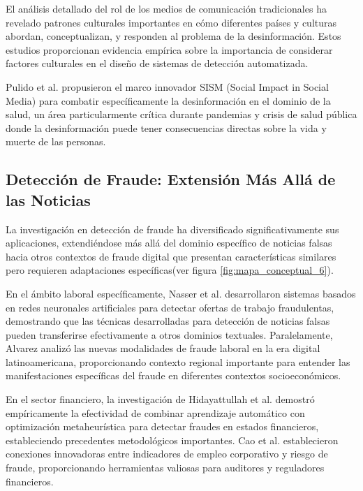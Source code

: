 El análisis detallado del rol de los medios de comunicación tradicionales \cite{carcamo2021fake, perez2020fake} ha revelado patrones culturales importantes en cómo diferentes países y culturas abordan, conceptualizan, y responden al problema de la desinformación. Estos estudios proporcionan evidencia empírica sobre la importancia de considerar factores culturales en el diseño de sistemas de detección automatizada.

Pulido et al. \cite{pulido2020new} propusieron el marco innovador SISM (Social Impact in Social Media) para combatir específicamente la desinformación en el dominio de la salud, un área particularmente crítica durante pandemias y crisis de salud pública donde la desinformación puede tener consecuencias directas sobre la vida y muerte de las personas.

\subsection{Detección de Fraude: Extensión Más Allá de las Noticias}

La investigación en detección de fraude ha diversificado significativamente sus aplicaciones, extendiéndose más allá del dominio específico de noticias falsas hacia otros contextos de fraude digital que presentan características similares pero requieren adaptaciones específicas(ver figura \ref{fig:mapa_conceptual_6}).

En el ámbito laboral específicamente, Nasser et al. \cite{nasser2021online} desarrollaron sistemas basados en redes neuronales artificiales para detectar ofertas de trabajo fraudulentas, demostrando que las técnicas desarrolladas para detección de noticias falsas pueden transferirse efectivamente a otros dominios textuales. Paralelamente, Alvarez \cite{alvarez2021fraude} analizó las nuevas modalidades de fraude laboral en la era digital latinoamericana, proporcionando contexto regional importante para entender las manifestaciones específicas del fraude en diferentes contextos socioeconómicos.

En el sector financiero, la investigación de Hidayattullah et al. \cite{hidayattullah2020financial} demostró empíricamente la efectividad de combinar aprendizaje automático con optimización metaheurística para detectar fraudes en estados financieros, estableciendo precedentes metodológicos importantes. Cao et al. \cite{cao2020corporate} establecieron conexiones innovadoras entre indicadores de empleo corporativo y riesgo de fraude, proporcionando herramientas valiosas para auditores y reguladores financieros.

